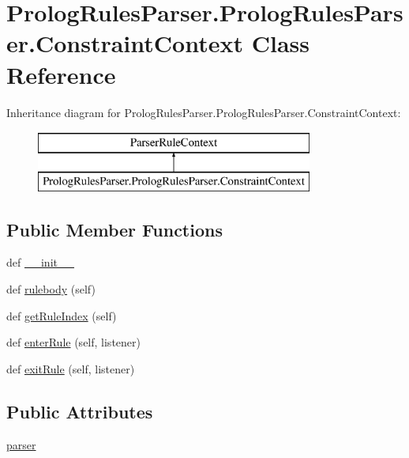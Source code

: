 \hypertarget{class_prolog_rules_parser_1_1_prolog_rules_parser_1_1_constraint_context}{}\section{Prolog\+Rules\+Parser.\+Prolog\+Rules\+Parser.\+Constraint\+Context Class Reference}
\label{class_prolog_rules_parser_1_1_prolog_rules_parser_1_1_constraint_context}
Inheritance diagram for Prolog\+Rules\+Parser.\+Prolog\+Rules\+Parser.\+Constraint\+Context\+:\begin{figure}[H]
\begin{center}
\leavevmode
\includegraphics[height=2.000000cm]{class_prolog_rules_parser_1_1_prolog_rules_parser_1_1_constraint_context}
\end{center}
\end{figure}
\subsection*{Public Member Functions}
\begin{DoxyCompactItemize}
\item 
def \hyperlink{class_prolog_rules_parser_1_1_prolog_rules_parser_1_1_constraint_context_affde47cb52a237662e25e3470cf45d05}{\+\_\+\+\_\+init\+\_\+\+\_\+}
\item 
def \hyperlink{class_prolog_rules_parser_1_1_prolog_rules_parser_1_1_constraint_context_a765de48ee1268501a49732c770807e6f}{rulebody} (self)
\item 
def \hyperlink{class_prolog_rules_parser_1_1_prolog_rules_parser_1_1_constraint_context_a92d749fba377a4d930d7c407898314cd}{get\+Rule\+Index} (self)
\item 
def \hyperlink{class_prolog_rules_parser_1_1_prolog_rules_parser_1_1_constraint_context_a89a18bf2bd7a798c7b48e95fb1cd1785}{enter\+Rule} (self, listener)
\item 
def \hyperlink{class_prolog_rules_parser_1_1_prolog_rules_parser_1_1_constraint_context_a86e20df4333c8c8f72f03ddf80be4759}{exit\+Rule} (self, listener)
\end{DoxyCompactItemize}
\subsection*{Public Attributes}
\begin{DoxyCompactItemize}
\item 
\hyperlink{class_prolog_rules_parser_1_1_prolog_rules_parser_1_1_constraint_context_ac610adf034c82d60388f8bf8695c3f34}{parser}
\end{DoxyCompactItemize}


